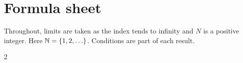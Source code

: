 \begingroup
\titleformat{\chapter}[block]{\normalfont\Large\itshape}{}{0pt}{}
\titlespacing*{\chapter}{0pt}{0pt}{6pt}
\chapter{Formula sheet}
\label{ch:appendix:formula-sheet}

\footnotesize
\setlength{\parindent}{0pt}
\setlength{\parskip}{0pt}
\setlength{\columnsep}{24pt}
\setlength{\multicolsep}{8pt}
\setlength{\abovedisplayskip}{2pt plus 1pt minus 1pt}
\setlength{\belowdisplayskip}{2pt plus 1pt minus 1pt}
\setlength{\abovedisplayshortskip}{1pt}
\setlength{\belowdisplayshortskip}{1pt}
\titleformat{\section}{\normalfont\small\itshape}{\thesection}{0.5em}{}
\titlespacing*{\section}{0pt}{3pt}{3pt}
\newcommand{\formulagroup}[1]{%
  \par\addvspace{3pt}\noindent\textbf{#1}\par\nobreak
}
\newcommand{\sheetsum}{\sum\nolimits}
\newcommand{\formulacolumnbreak}{%
  \ifdefined\standaloneformulasheet\columnbreak\fi
}

\begin{fullwidth}
  Throughout, limits are taken as the index tends to infinity and $N$ is
  a positive integer.
  Here $\mathbb{N}=\{1,2,\ldots\}$. Conditions are part of each result.

  \begin{multicols}{2}
    \raggedcolumns
    
    
    
    \formulacolumnbreak
    
    
    \formulacolumnbreak
    
  \end{multicols}
\end{fullwidth}
\endgroup
